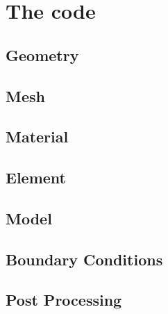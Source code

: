 \chapter{The code}

\section{Geometry}

\section{Mesh}

\section{Material}

\section{Element}

\section{Model}

\section{Boundary Conditions}

\section{Post Processing}
